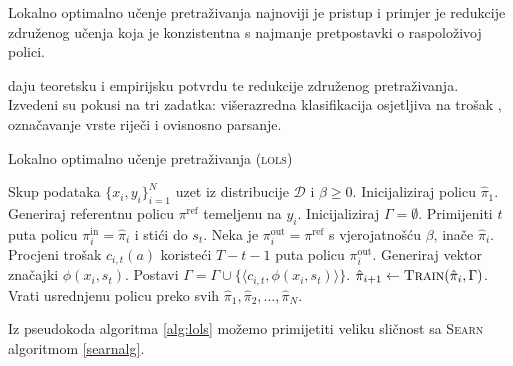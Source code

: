 Lokalno optimalno učenje pretraživanja 
najnoviji je pristup i primjer je redukcije združenog učenja koja je
konzistentna s najmanje pretpostavki o raspoloživoj polici.

\cite{daume15lols} daju teoretsku i empirijsku potvrdu te redukcije združenog
pretraživanja. Izvedeni su pokusi na tri zadatka: višerazredna klasifikacija
osjetljiva na trošak ,
označavanje vrste riječi i ovisnosno parsanje.

\begin{algorithm}
\caption{Lokalno optimalno učenje pretraživanja (\textsc{lols})}\label{alg:lols}
\begin{algorithmic}[1]
\Require Skup podataka $\{x_i, y_i\}_{i=1}^N$ uzet iz distribucije $\mathcal{D}$
         i $\beta \geq 0$. %
\State Inicijaliziraj policu $\hat{\pi}_1$.
  \State Generiraj referentnu policu $\pi^{\text{ref}}$ temeljenu na $y_i$.
  \State Inicijaliziraj $\Gamma = \emptyset$. 
    \State Primijeniti $t$ puta policu $\pi_{i}^{\text{in}} = \hat{\pi}_i$  i stići do $s_t$.  \label{alg:lols:learned}
      \State Neka je  $\pi_{i}^{\text{out}} = \pi^{\text{ref}}$ s vjerojatnošću $\beta$, inače $\hat{\pi}_i$.
      \State Procjeni trošak $c_{i,t}(a)$ koristeći $T-t-1$ puta policu $\pi_{i}^{\text{out}}$.  \label{alg:lols:mixture}
    \EndFor
    \State Generiraj vektor značajki $\phi(x_i, s_t)$.
    \State Postavi $\Gamma = \Gamma \cup \{\langle c_{i,t}, \phi(x_i, s_t) \rangle\}$.
  \EndFor
  \State $\hat{\pi}_{i+1} \gets \textsc{Train}(\hat{\pi}_i, \Gamma)$.
\EndFor
\State Vrati usrednjenu policu preko svih $\hat{\pi}_1, \hat{\pi}_2, \ldots, \hat{\pi}_N$.
\end{algorithmic}
\end{algorithm}

Iz pseudokoda algoritma \ref{alg:lols} možemo primijetiti veliku sličnost sa
\textsc{Searn} algoritmom \ref{searnalg}.
